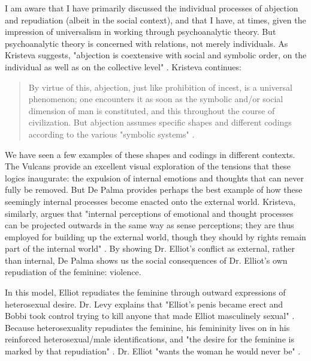 \documentclass[letterpaper,12pt]{turabian-researchpaper}
\begin{document}
I am aware that I have primarily discussed the individual processes of abjection and repudiation (albeit in the social context), and that I have, at times, given the impression of universalism in  working through psychoanalytic theory. But psychoanalytic theory is concerned with relations, not merely individuals. As Kristeva suggests, "abjection is coextensive with social and symbolic order, on the individual as well as on the collective level" \autocite[68]{kristeva_powers_1982}. Kristeva continues:
\begin{quotation}
\noindent By virtue of this, abjection, just like prohibition of incest, is a universal phenomenon; one encounters it as soon as the symbolic and/or social dimension of man is constituted, and this throughout the course of civilization. But abjection assumes specific shapes and different codings according to the various "symbolic systems" \autocite[68]{kristeva_powers_1982}.
\end{quotation}
\noindent We have seen a few examples of these shapes and codings in different contexts. The Vulcans provide an excellent visual exploration of the tensions that these logics inaugurate: the expulsion of internal emotions and thoughts that can never fully be removed. But De Palma provides perhaps the best example of how these seemingly internal processes become enacted onto the external world. Kristeva, similarly, argues that "internal perceptions of emotional and thought processes can be projected outwards in the same way as sense perceptions; they are thus employed for building up the external world, though they should by rights remain part of the internal world" \autocite[60]{kristeva_powers_1982}. By showing Dr. Elliot's conflict as external, rather than internal, De Palma shows us the social consequences of Dr. Elliot's own repudiation of the feminine: violence.

In this model, Elliot repudiates the feminine through outward expressions of heterosexual desire. Dr. Levy explains that "Elliot's penis became erect and Bobbi took control trying to kill anyone that made Elliot masculinely sexual" \autocite{de_palma_dressed_2015}. Because heterosexuality repudiates the feminine, his femininity lives on in his reinforced heterosexual/male identifications, and "the desire for the feminine is marked by that repudiation" \autocite[248]{butler_melancholy_2004}. Dr. Elliot "wants the woman he would never be" \autocite[248]{butler_melancholy_2004}. 
\end{document}
